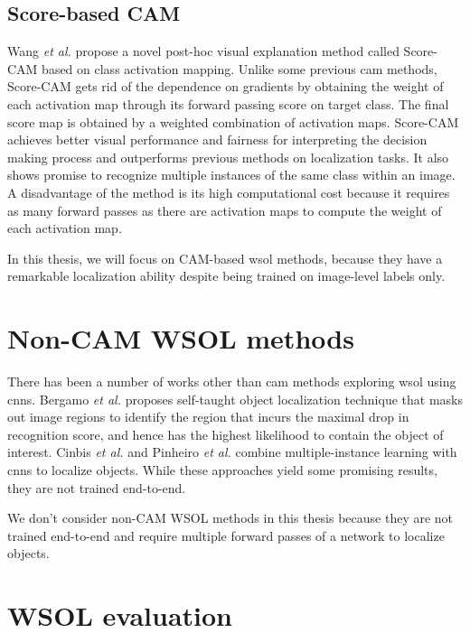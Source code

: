 \subsection{Score-based CAM}
Wang \textit{et al.} \cite{wang2020score} propose a novel post-hoc visual explanation method called Score-CAM based on class activation mapping. Unlike some previous \acrshort{cam} methods, Score-CAM gets rid of the dependence on gradients by obtaining the weight of each activation map through its forward passing score on target class. The final score map is obtained by a weighted combination of activation maps. Score-CAM achieves better visual performance and fairness for interpreting the decision making process and outperforms previous methods on localization tasks. It also shows promise to recognize multiple instances of the same class within an image. A disadvantage of the method is its high computational cost because it requires as many forward passes as there are activation maps to compute the weight of each activation map.

In this thesis, we will focus on CAM-based \acrshort{wsol} methods, because they have a remarkable localization ability despite being trained on image-level labels only.

\section{Non-CAM WSOL methods}
There has been a number of works other than \acrshort{cam} methods exploring \acrfull{wsol} using \acrshort{cnn}s. Bergamo \textit{et al.} \cite{bazzani2016self} proposes self-taught object localization technique that masks out image regions to identify the region that incurs the maximal drop in recognition score, and hence has the highest likelihood to contain the object of interest. Cinbis \textit{et al.} \cite{cinbis2016weakly} and Pinheiro \textit{et al.} \cite{pinheiro2015image} combine multiple-instance learning with \acrshort{cnn}s to localize objects. While these approaches yield some promising results, they are not trained end-to-end.

We don't consider non-CAM WSOL methods in this thesis because they are not trained end-to-end and require multiple forward passes of a network to localize objects.

\section{WSOL evaluation}
